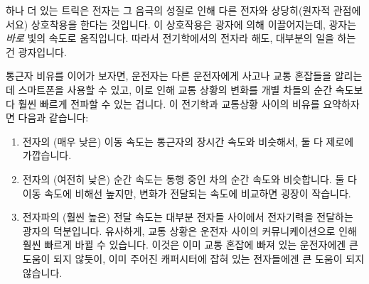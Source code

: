 \begin{enumerate}
	하나 더 있는 트릭은 전자는 그 음극의 성질로 인해 다른 전자와
	상당히(원자적 관점에서요) 상호착용을 한다는 것입니다.
	이 상호작용은 광자에 의해 이끌어지는데, 광자는 \emph{바로} 빛의 속도로
	움직입니다.
	따라서 전기학에서의 전자라 해도, 대부분의 일을 하는건 광자입니다.

	통근자 비유를 이어가 보자면, 운전자는 다른 운전자에게 사고나 교통
	혼잡들을 알리는데 스마트폰을 사용할 수 있고, 이로 인해 교통 상황의
	변화를 개별 차들의 순간 속도보다 훨씬 빠르게 전파할 수 있는 겁니다.
	이 전기학과 교통상황 사이의 비유를 요약하자면 다음과 같습니다:

	\begin{enumerate}
	\item	전자의 (매우 낮은) 이동 속도는 통근자의 장시간 속도와 비슷해서,
		둘 다 제로에 가깝습니다.
	\item	전자의 (여전히 낮은) 순간 속도는 통행 중인 차의 순간 속도와 비슷합니다.
		둘 다 이동 속도에 비해선 높지만, 변화가 전달되는 속도에 비교하면 굉장이 작습니다.
	\item	전자파의 (훨씬 높은) 전달 속도는 대부분 전자들 사이에서
		전자기력을 전달하는 광자의 덕분입니다.
		유사하게, 교통 상황은 운전자 사이의 커뮤니케이션으로 인해 훨씬
		빠르게 바뀔 수 있습니다.
		이것은 이미 교통 혼잡에 빠져 있는 운전자에겐 큰 도움이 되지
		않듯이, 이미 주어진 캐퍼시터에 잡혀 있는 전자들에겐 큰 도움이
		되지 않습니다.
	\end{enumerate}

\end{enumerate}
